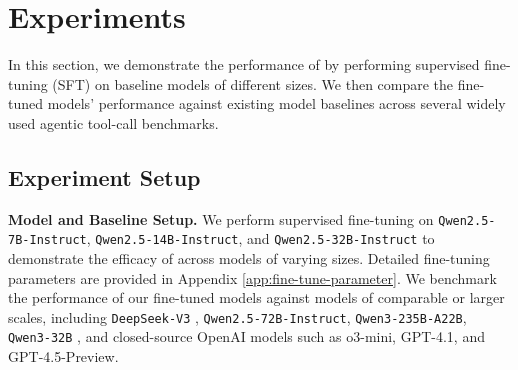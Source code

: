 \section{Experiments}

In this section, we demonstrate the performance of \dataname by performing supervised fine-tuning (SFT) on baseline models of different sizes. We then compare the fine-tuned models' performance against existing model baselines across several widely used agentic tool-call benchmarks.

\subsection{Experiment Setup}

\textbf{Model and Baseline Setup.} We perform supervised fine-tuning on \texttt{Qwen2.5-7B-Instruct}, \texttt{Qwen2.5-14B-Instruct}, and \texttt{Qwen2.5-32B-Instruct} \citep{qwen2.5} to demonstrate the efficacy of \dataname across models of varying sizes. Detailed fine-tuning parameters are provided in Appendix \ref{app:fine-tune-parameter}. We benchmark the performance of our fine-tuned models against models of comparable or larger scales, including \texttt{DeepSeek-V3} \cite{deepseekai2025deepseekv3technicalreport}, \texttt{Qwen2.5-72B-Instruct}, \texttt{Qwen3-235B-A22B}, \texttt{Qwen3-32B} \cite{yang2025qwen3technicalreport}, and closed-source OpenAI models such as o3-mini, GPT-4.1, and GPT-4.5-Preview.

